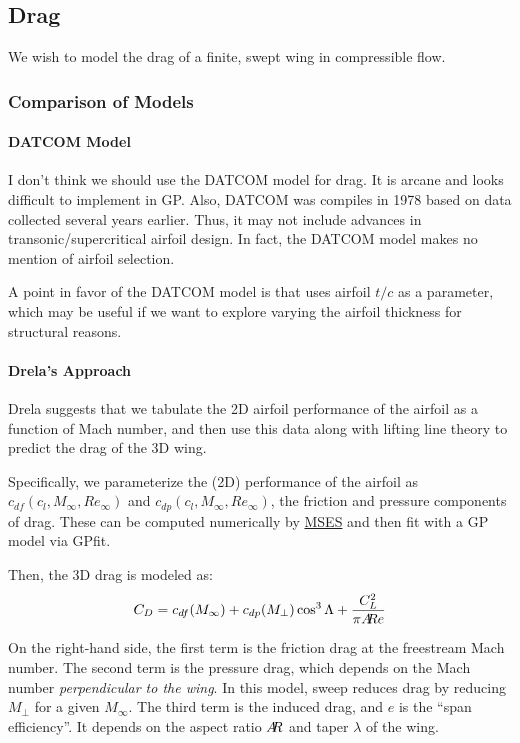 \documentclass[12pt]{article}
\newcommand{\ar}{A\mkern-6mu R}
\begin{document}
\subsection{Drag}
We wish to model the drag of a finite, swept wing in compressible flow. 

\subsubsection{Comparison of Models}
\paragraph{DATCOM Model}
I don't think we should use the DATCOM model for drag. It is arcane and looks difficult to implement in GP. Also, DATCOM was compiles in 1978 based on data collected several years earlier. Thus, it may not include advances in transonic/supercritical airfoil design. In fact, the DATCOM model makes no mention of airfoil selection.

A point in favor of the DATCOM model is that uses airfoil $t/c$ as a parameter, which may be useful if we want to explore varying the airfoil thickness for structural reasons. 

\paragraph{Drela's Approach}
Drela \cite{Drela2014} suggests that we tabulate the 2D airfoil performance of the airfoil as a function of Mach number, and then use this data along with lifting line theory to predict the drag of the 3D wing.

Specifically, we parameterize the (2D) performance of the airfoil as $c_{df}(c_l, M_\infty, Re_\infty)$ and $c_{dp}(c_l, M_\infty, Re_\infty)$, the friction and pressure components of drag. These can be computed numerically by \href{http://web.mit.edu/drela/Public/web/mses/}{MSES} and then fit with a GP model via GPfit.

Then, the 3D drag is modeled as:
\begin{equation}
\label{eq:3d_wing_drag_drela}
C_D = c_{df}(M_\infty) + c_{dp}(M_\perp) \cos^3\Lambda + \frac{C_L^2}{\pi \ar e}
\end{equation}

On the right-hand side, the first term is the friction drag at the freestream Mach number. The second term is the pressure drag, which depends on the Mach number \emph{perpendicular to the wing}. In this model, sweep reduces drag by reducing $M_\perp$ for a given $M_\infty$. The third term is the induced drag, and $e$ is the ``span efficiency''. It depends on the aspect ratio $\ar$ and taper $\lambda$ of the wing.
\end{document}
